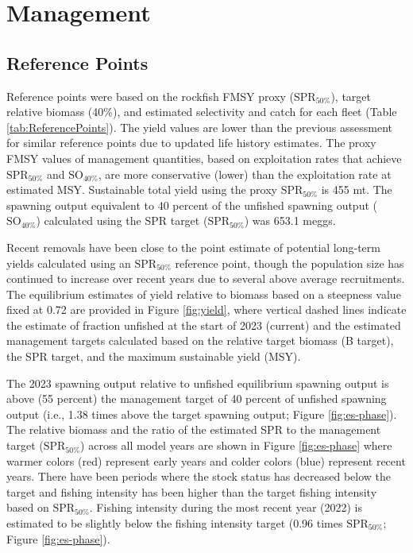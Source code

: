 \documentclass[11pt,
  english,
  letterpaper,
]{article}
\begin{document}
\hypertarget{management}{%
\section{Management}\label{management}}

\hypertarget{reference-points-1}{%
\subsection{Reference Points}\label{reference-points-1}}

Reference points were based on the rockfish FMSY proxy (\(\text{SPR}_{50\%}\)), target relative biomass (40\%), and estimated selectivity and catch for each fleet (Table \ref{tab:ReferencePoints}). The yield values are lower than the previous assessment for similar reference points due to updated life history estimates. The proxy FMSY values of management quantities, based on exploitation rates that achieve \(\text{SPR}_{50\%}\) and \(\text{SO}_{40\%}\), are more conservative (lower) than the exploitation rate at estimated MSY. Sustainable total yield using the proxy \(\text{SPR}_{50\%}\) is 455 mt. The spawning output equivalent to 40 percent of the unfished spawning output (\(\text{SO}_{40\%}\)) calculated using the SPR target (\(\text{SPR}_{50\%}\)) was 653.1 meggs.

Recent removals have been close to the point estimate of potential long-term yields calculated using an \(\text{SPR}_{50\%}\) reference point, though the population size has continued to increase over recent years due to several above average recruitments. The equilibrium estimates of yield relative to biomass based on a steepness value fixed at 0.72 are provided in Figure \ref{fig:yield}, where vertical dashed lines indicate the estimate of fraction unfished at the start of 2023 (current) and the estimated management targets calculated based on the relative target biomass (B target), the SPR target, and the maximum sustainable yield (MSY).

The 2023 spawning output relative to unfished equilibrium spawning output is above (55 percent) the management target of 40 percent of unfished spawning output (i.e., 1.38 times above the target spawning output; Figure \ref{fig:es-phase}). The relative biomass and the ratio of the estimated SPR to the management target (\(\text{SPR}_{50\%}\)) across all model years are shown in Figure \ref{fig:es-phase} where warmer colors (red) represent early years and colder colors (blue) represent recent years. There have been periods where the stock status has decreased below the target and fishing intensity has been higher than the target fishing intensity based on \(\text{SPR}_{50\%}\). Fishing intensity during the most recent year (2022) is estimated to be slightly below the fishing intensity target (0.96 times \(\text{SPR}_{50\%}\); Figure \ref{fig:es-phase}).
\end{document}

